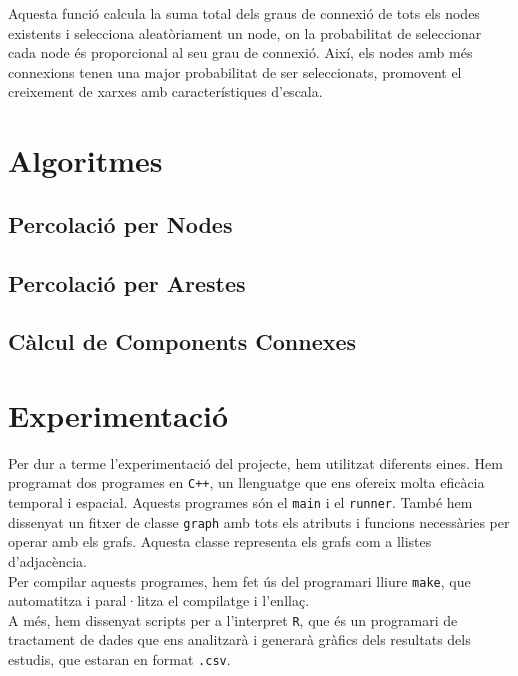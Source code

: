 \documentclass[a4paper]{article}
\begin{document}
	Aquesta funció calcula la suma total dels graus de connexió de tots els nodes existents i selecciona aleatòriament un node, on la probabilitat de seleccionar cada node és proporcional al seu grau de connexió. Així, els nodes amb més connexions tenen una major probabilitat de ser seleccionats, promovent el creixement de xarxes amb característiques d'escala.
	
	\newpage
	\section{Algoritmes}
	
	\subsection{Percolació per Nodes}
	
	\subsection{Percolació per Arestes}
	
	\subsection{Càlcul de Components Connexes}
	
	\newpage
	\section{Experimentació}
	
	Per dur a terme l'experimentació del projecte, hem utilitzat diferents eines. Hem programat dos programes en \texttt{C++}, un llenguatge que ens ofereix molta eficàcia temporal i espacial. Aquests programes són el \texttt{main} i el \texttt{runner}. També hem dissenyat un fitxer de classe \texttt{graph} amb tots els atributs i funcions necessàries per operar amb els grafs. Aquesta classe representa els grafs com a llistes d'adjacència. \\
	
	Per compilar aquests programes, hem fet ús del programari lliure \texttt{make}, que automatitza i paral·litza el compilatge i l'enllaç. \\
	
	A més, hem dissenyat scripts per a l'interpret \texttt{R}, que és un programari de tractament de dades que ens analitzarà i generarà gràfics dels resultats dels estudis, que estaran en format \texttt{.csv}. \\
	
\end{document}
